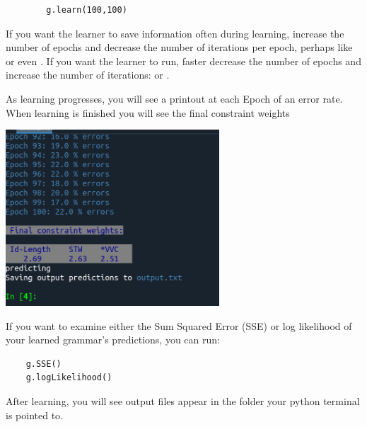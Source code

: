 \documentclass[12]{article}
\begin{document}
	\begin{verbatim}
		g.learn(100,100)
	\end{verbatim}


	
If you want the learner to save information often during learning, increase the number of epochs and decrease the number of iterations per epoch, perhaps like  or even .  If you want the learner to run, faster decrease the number of epochs and increase the number of iterations:  or .

As learning progresses, you will see a printout at each Epoch of an error rate.  When learning is finished you will see the final constraint weights

\includegraphics[width=0.6\textwidth]{embeddedImages/epochPrintout.png}

If you want to examine either the Sum Squared Error (SSE) or log likelihood of your learned grammar's predictions, you can run:

\begin{verbatim}
	g.SSE()
	g.logLikelihood()
\end{verbatim}

After learning, you will see output files appear in the folder your python terminal is pointed to.
\end{document}
